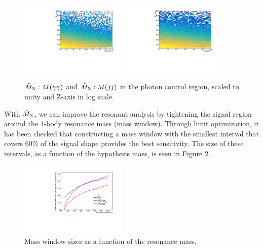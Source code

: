 \begin{figure}[h]
  \centering
  \includegraphics[width=0.45\textwidth]{figures/sec-window/mgg2d.pdf}\hfil
  \includegraphics[width=0.45\textwidth]{figures/sec-window/mjj2d.pdf}\hfil
  \caption{$\tilde{M}_{\mathrm{X}}:M(\gamma\gamma)$ and $\tilde{M}_{\mathrm{X}}:M(jj)$ in the photon control region, scaled to unity and Z-axis in log scale. }
  \label{fig:mx2d}
\end{figure}

With $\tilde{M}_{\mathrm{X}}$, we can improve the resonant analysis by tightening the signal region around the 4-body resonance mass (mass window). 
Through limit optimization, it has been checked that constructing a mass window with the smallest interval that covers $60\%$ of the signal shape provides the best sensitivity. 
The size of these intervals, as a function of the hypothesis mass, is seen in Figure \ref{fig:masswindowwidths}. 

\begin{figure}[h]
  \centering
  \includegraphics[width=0.45\textwidth]{figures/sec-window/width_60_prime.pdf}\hfil

  \caption{Mass window sizes as a function of the resonance mass. }
  \label{fig:masswindowwidths}
\end{figure}

